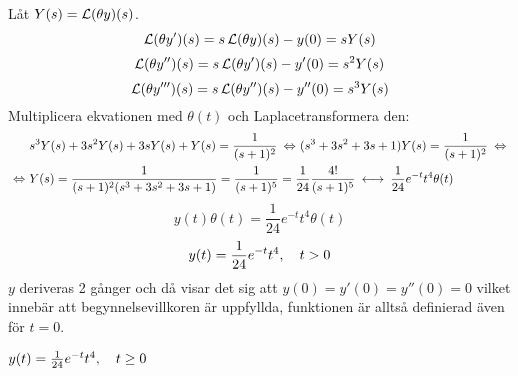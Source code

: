 \pagebreak
\begin{task}{5.7}
	Låt $Y(s)=\operatorname{\mathcal{L}}(\theta y)(s)$.
	\[\operatorname{\mathcal{L}}(\theta y')(s)=s\operatorname{\mathcal{L}}(\theta y)(s)-y(0)=sY(s)\]
	\[\operatorname{\mathcal{L}}(\theta y'')(s)=s\operatorname{\mathcal{L}}(\theta y')(s)-y'(0)=s^2Y(s)\]
	\[\operatorname{\mathcal{L}}(\theta y''')(s)=s\operatorname{\mathcal{L}}(\theta y'')(s)-y''(0)=s^3Y(s)\]
	Multiplicera ekvationen med $\theta(t)$ och Laplacetransformera den:
	\begin{align*}
	&s^3Y(s)+3s^2Y(s)+3sY(s)+Y(s)=\frac{1}{(s+1)^2} \lra
	(s^3+3s^2+3s+1)Y(s)=\frac{1}{(s+1)^2} \lra \\ \lra
	&Y(s)=\frac{1}{(s+1)^2(s^3+3s^2+3s+1)}=
	\frac{1}{(s+1)^5}=
	\frac{1}{24}\*\frac{4!}{(s+1)^5} \llra
	\frac{1}{24}e^{-t}t^4\theta(t)
	\end{align*}
	\[y(t)\theta(t)=\frac{1}{24}e^{-t}t^4\theta(t)\]
	\[y(t)=\frac{1}{24}e^{-t}t^4, \quad t>0\]
	$y$ deriveras 2 gånger och då visar det sig att $y(0)=y'(0)=y''(0)=0$ vilket innebär att begynnelsevillkoren är uppfyllda, funktionen är alltså definierad även för $t=0$.
	
	\ans $y(t)=\frac{1}{24}e^{-t}t^4, \quad t\ge0$
\end{task}